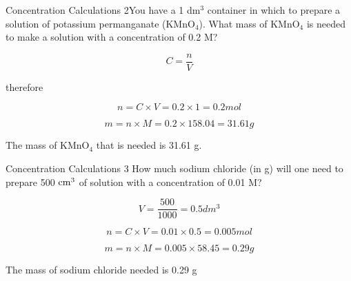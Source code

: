 \begin{wex}{Concentration Calculations 2}{You have a 1 dm$^{3}$ container in which to prepare a solution of potassium permanganate (KMnO$_{4}$). What mass of KMnO$_{4}$ is needed to make a solution with a concentration of 0.2 M?\\}
{

\begin{equation*}
C = \frac{n}{V}
\end{equation*}

therefore

\begin{equation*}
n = C \times V = 0.2 \times 1 = 0.2 mol
\end{equation*}

\begin{equation*}
m = n \times M = 0.2 \times 158.04 = 31.61 g
\end{equation*}

The mass of KMnO$_{4}$ that is needed is 31.61 g.
}
\end{wex}

\begin{wex}{Concentration Calculations 3}{
How much sodium chloride (in g) will one need to prepare 500 $\rm{cm}^{3}$ of solution with a concentration of 0.01 M?\\}

{

\begin{equation*}
V = \frac{500}{1000} = 0.5 dm^{3}
\end{equation*}

\begin{equation*}
n = C \times V = 0.01 \times 0.5 = 0.005 mol
\end{equation*}

\begin{equation*}
m = n \times M = 0.005 \times 58.45 = 0.29 g
\end{equation*}


The mass of sodium chloride needed is 0.29 g
}\end{wex}

